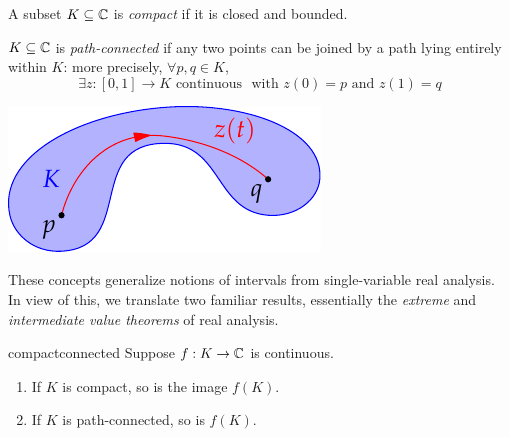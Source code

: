 \begin{defn}{}{}
	\exstart A subset $K\subseteq\mathbb{C}$ is \emph{compact} if it is closed and bounded.
	\begin{enumerate}\setcounter{enumi}{1}
	  \begin{minipage}[t]{0.6\linewidth}\vspace{0pt}
	  	\item $K\subseteq\mathbb{C}$ is \emph{path-connected} if any two points can be joined by a path lying entirely within $K$: more precisely, $\forall p,q\in K$,
	  	\[
	  		\exists z:[0,1]\to K \text{ continuous } \text{ with }
	  z(0)=p \text{ and }z(1)=q
	  	\]
	  \end{minipage} 
	  \begin{minipage}[t]{0.39\linewidth}\vspace{-12pt}
			\flushright\includegraphics[scale=1]{limits-topology}
	  \end{minipage} 
	\end{enumerate} 
\end{defn}

These concepts generalize notions of intervals from single-variable real analysis. In view of this, we translate two familiar results, essentially the \emph{extreme} and \emph{intermediate value theorems} of real analysis.

\begin{thm}{}{compactconnected}
	Suppose $f:K\to\mathbb{C}$ is continuous.
	\begin{enumerate}
  	\item If $K$ is compact, so is the image $f(K)$.
  	\item If $K$ is path-connected, so is $f(K)$.
	\end{enumerate}
\end{thm}

